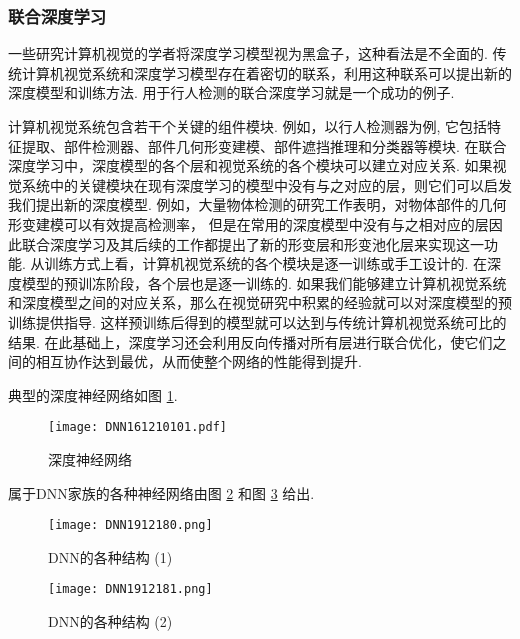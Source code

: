 \subsubsection{联合深度学习}
    一些研究计算机视觉的学者将深度学习模型视为黑盒子，这种看法是不全面的.
    传统计算机视觉系统和深度学习模型存在着密切的联系，利用这种联系可以提出新的深度模型和训练方法. 用于行人检测的联合深度学习就是一个成功的例子.
\begin{example}
计算机视觉系统包含若干个关键的组件模块.
例如，以行人检测器为例, 它包括特征提取、部件检测器、部件几何形变建模、部件遮挡推理和分类器等模块.
在联合深度学习中，深度模型的各个层和视觉系统的各个模块可以建立对应关系.
如果视觉系统中的关键模块在现有深度学习的模型中没有与之对应的层，则它们可以启发我们提出新的深度模型.
例如，大量物体检测的研究工作表明，对物体部件的几何形变建模可以有效提高检测率，
但是在常用的深度模型中没有与之相对应的层因此联合深度学习及其后续的工作都提出了新的形变层和形变池化层来实现这一功能.
从训练方式上看，计算机视觉系统的各个模块是逐一训练或手工设计的. 在深度模型的预训冻阶段，各个层也是逐一训练的.
如果我们能够建立计算机视觉系统和深度模型之间的对应关系，那么在视觉研究中积累的经验就可以对深度模型的预训练提供指导.
这样预训练后得到的模型就可以达到与传统计算机视觉系统可比的结果.
在此基础上，深度学习还会利用反向传播对所有层进行联合优化，使它们之间的相互协作达到最优，从而使整个网络的性能得到提升.
\end{example}
典型的深度神经网络如图 \ref{DNN191225001}.
\begin{figure}[H]
    \centering
    \texttt{[image: DNN161210101.pdf]}
    \vspace{-0.3cm}
    \caption{深度神经网络}
    \label{DNN191225001}
    \vspace{-0.3cm}
\end{figure}
属于DNN家族的各种神经网络由图 \ref{DNN191218121500010} 和图 \ref{DNN191218121500011} 给出.
\begin{figure}[H]
\centering
\texttt{[image: DNN1912180.png]}
\caption{DNN的各种结构 (1)}
\label{DNN191218121500010}
\end{figure}
\begin{figure}[H]
    \centering
    \texttt{[image: DNN1912181.png]}
    \caption{DNN的各种结构 (2)}
    \label{DNN191218121500011}
    \vspace{-0.4cm}
\end{figure}

